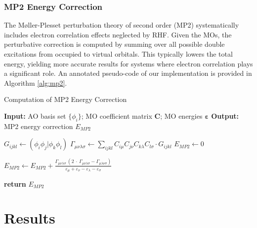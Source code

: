 \documentclass[12pt]{article}
\begin{document}
\subsubsection*{MP2 Energy Correction}

The Møller-Plesset perturbation theory of second order (MP2) systematically includes electron correlation effects neglected by RHF. Given the MOs, the perturbative correction is computed by summing over all possible double excitations from occupied to virtual orbitals. This typically lowers the total energy, yielding more accurate results for systems where electron correlation plays a significant role. An annotated pseudo-code of our implementation is provided in Algorithm \ref{alg:mp2}. 

\begin{algorithm}[H]
    \caption{Computation of MP2 Energy Correction}
    \begin{algorithmic}[1]
        \Statex \textbf{Input:} AO basis set $\{\phi_i\}$; MO coefficient matrix $\mathbf{C}$; MO energies $\boldsymbol{\varepsilon}$
        \Statex \textbf{Output:} MP2 energy correction $E_{MP2}$

        \State $G_{ijkl} \gets (\phi_i \phi_j | \phi_k \phi_l)$ 
        \State $\Gamma_{\mu \nu \lambda \sigma} \gets \sum_{ijkl} C_{i \mu} C_{j \nu} C_{k \lambda} C_{l \sigma} \cdot G_{ijkl}$ 
        \State $E_{MP2} \gets 0$ 

                \State $E_{MP2} \gets E_{MP2} + \frac
                {\Gamma_{\mu \nu \lambda \sigma} \: (2 \: \cdot \: \Gamma_{\mu \nu \lambda \sigma} - \Gamma_{\mu \lambda \nu \sigma})}
                {\varepsilon_\mu + \varepsilon_\nu - \varepsilon_\lambda - \varepsilon_\sigma}$ 
            \EndFor
        \EndFor

        \State \textbf{return} $E_{MP2}$
    \end{algorithmic}
    \label{alg:mp2}
\end{algorithm}

\section{Results}
\end{document}
